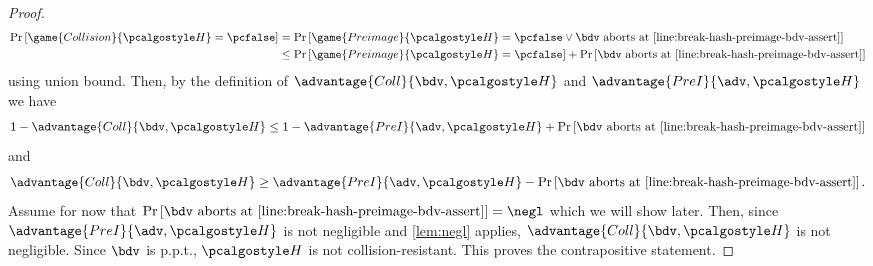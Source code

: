 \begin{proof}
  \begin{align*}
  \pr{\game{Collision}{\algo{H}} = \pcfalse} &= \pr{\game{Preimage}{\algo{H}} = \pcfalse \vee \bdv \text{ aborts at \cref{line:break-hash-preimage-bdv-assert}} } \\
  &\le \pr{\game{Preimage}{\algo{H}} = \pcfalse} + \pr{\bdv \text{ aborts at \cref{line:break-hash-preimage-bdv-assert}} } \\
  \end{align*}
  using union bound.
  Then, by the definition of $\advantage{Coll}{\bdv, \algo{H}}$ and $\advantage{PreI}{\adv, \algo{H}}$ we have
  \begin{align*}
    1 - \advantage{Coll}{\bdv, \algo{H}} &\le 1 - \advantage{PreI}{\adv, \algo{H}} + \pr{\bdv \text{ aborts at \cref{line:break-hash-preimage-bdv-assert}} }\\
  \end{align*}
  and
  \begin{align*}
    \advantage{Coll}{\bdv, \algo{H}} &\ge \advantage{PreI}{\adv, \algo{H}} - \pr{\bdv \text{ aborts at \cref{line:break-hash-preimage-bdv-assert}} }.\\
  \end{align*}
  Assume for now that $\pr{\bdv \text{ aborts at \cref{line:break-hash-preimage-bdv-assert}} } = \negl$ which we will show later.
  Then, since $\advantage{PreI}{\adv, \algo{H}}$ is not negligible and \cref{lem:negl} applies,
  $\advantage{Coll}{\bdv, \algo{H}}$ is not negligible.
  Since $\bdv$ is p.p.t., $\algo{H}$ is not collision-resistant.
  This proves the contrapositive statement.


\end{proof}
